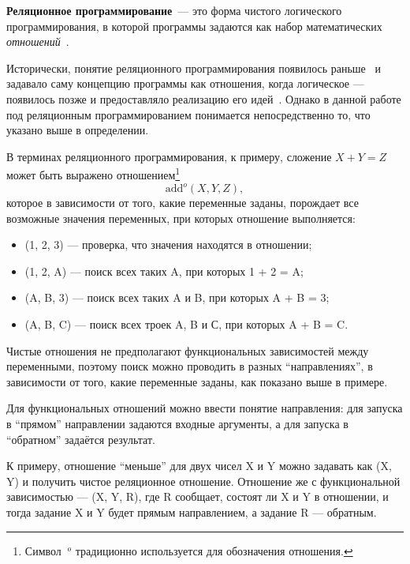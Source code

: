 {\bf Реляционное программирование}~--- это форма чистого логического
программирования, в которой программы задаются как набор
математических {\it отношений}~\cite{byrdMK}.

Исторически, понятие реляционного программирования появилось
раньше~\cite{relML} и задавало саму концепцию программы как отношения,
когда логическое --- появилось позже и предоставляло реализацию его
идей~\cite{logicMJ}.
Однако в данной работе под реляционным программированием понимается
непосредственно то, что указано выше в определении.

В терминах реляционного программирования, к примеру, сложение $X + Y = Z$
может быть выражено отношением\footnote{Символ $\ ^o$ традиционно
используется для обозначения отношения.}
\[\text{add}^o (X, Y, Z),\]
которое в зависимости от того, какие переменные заданы, порождает
все возможные значения переменных, при которых отношение выполняется:
\begin{itemize}
\item {}(1, 2, 3) --- проверка, что значения находятся в отношении;
\item {}(1, 2, A) --- поиск всех таких A, при которых 1 + 2 = A;
\item {}(A, B, 3) --- поиск всех таких A и B, при которых A + B = 3;
\item {}(A, B, C) --- поиск всех троек A, B и С, при которых A + B = C.
\end{itemize}

Чистые отношения не предполагают функциональных зависимостей между переменными,
поэтому поиск можно проводить в разных ``направлениях'', в зависимости от
того, какие переменные заданы, как показано выше в примере.

Для функциональных отношений можно ввести понятие направления: для запуска
в ``прямом'' направлении задаются входные аргументы, а для запуска в
``обратном'' задаётся результат.

К примеру, отношение ``меньше'' для двух чисел X и Y можно задавать как
(X, Y) и получить чистое реляционное отношение.
Отношение же с функциональной зависимостью ---
(X, Y, R), где R сообщает, состоят ли X и Y
в отношении, и тогда задание X и Y будет
прямым направлением, а задание R --- обратным.


